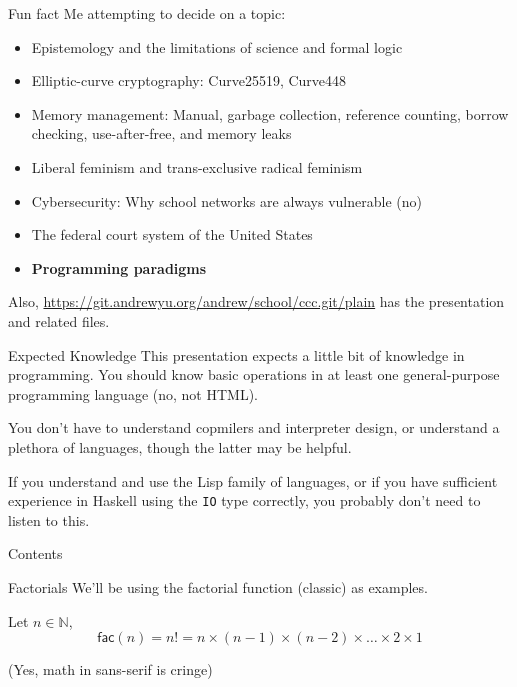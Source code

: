 \documentclass[aspectratio=169]{beamer}
\begin{document}
\begin{frame}{Fun fact}
	Me attempting to decide on a topic:
	\begin{itemize}
		\item Epistemology and the limitations of science and formal logic
		\item Elliptic-curve cryptography: Curve25519, Curve448
		\item Memory management: Manual, garbage collection, reference counting, borrow checking, use-after-free, and memory leaks
		\item Liberal feminism and trans-exclusive radical feminism
		\item Cybersecurity: Why school networks are always vulnerable (no)
		\item The federal court system of the United States
		\item \textbf{Programming paradigms}
	\end{itemize}

	Also, \url{https://git.andrewyu.org/andrew/school/ccc.git/plain} has the presentation and related files.
\end{frame}

\begin{frame}{Expected Knowledge}
	This presentation expects a little bit of knowledge in programming. You should know basic operations in at least one general-purpose programming language (no, not HTML).

	You don't have to understand copmilers and interpreter design, or understand a plethora of languages, though the latter may be helpful.

	If you understand and use the Lisp family of languages, or if you have sufficient experience in Haskell using the \texttt{IO} type correctly, you probably don't need to listen to this.
\end{frame}

\begin{frame}{Contents}
	\tableofcontents
\end{frame}

\begin{frame}{Factorials}
	We'll be using the factorial function (classic) as examples.

	Let $n\in\mathbb{N}$,
	\begin{equation*}
		\mathsf{fac}(n) = n! = n\times (n-1)\times (n-2)\times\ldots\times 2\times 1
	\end{equation*}

	\tiny (Yes, math in sans-serif is cringe)
\end{frame}
\end{document}
